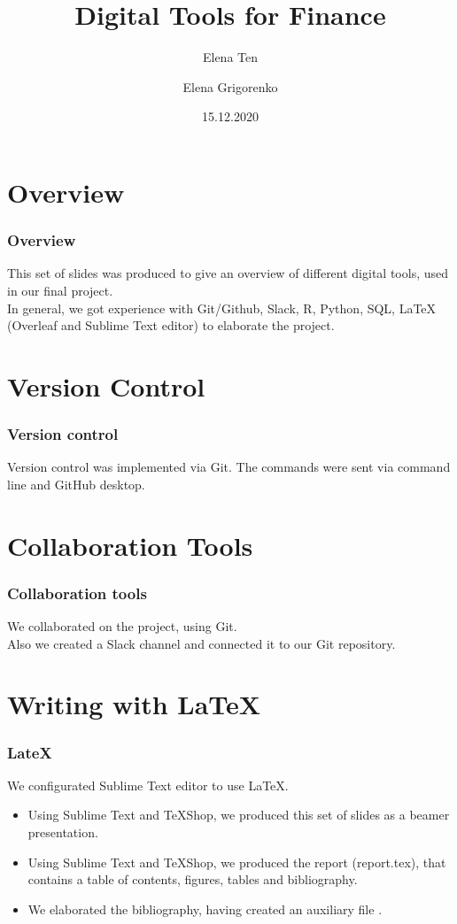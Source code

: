 \documentclass {beamer}
\title{Digital Tools for Finance}
\author [Ten, Grigorenko] {Elena Ten \and Elena Grigorenko}
\institute [UZH] {University of Zurich}
\date {15.12.2020}
\begin{document}
\frame{\titlepage}

\section{Overview}
\begin{frame}
\frametitle{Overview}
This set of slides was produced to give an overview of different digital tools, used in our final project.\\
In general, we got experience with Git/Github, Slack, R, Python, SQL, LaTeX (Overleaf and Sublime Text editor) to elaborate the project. 

\end{frame}



\section{Version Control}
\begin{frame}
\frametitle{Version control}
Version control was implemented via Git. The commands were sent via command line and GitHub desktop.

\end{frame}


\section{Collaboration Tools}
\begin{frame}
\frametitle{Collaboration tools}
We collaborated on the project, using Git.\\
Also we created a Slack channel and connected it to our Git repository.

\end{frame}


\section{Writing with LaTeX}
\begin{frame}
\frametitle{LateX}
We configurated Sublime Text editor to use LaTeX.\\
\begin{itemize}
\item Using Sublime Text and TeXShop, we produced this set of slides as a beamer presentation.
\item Using Sublime Text and TeXShop, we produced the report (report.tex), that contains a table of contents, figures, tables and bibliography.
\item We elaborated the bibliography, having created an auxiliary file .
\end{itemize}

\end{frame}
\end{document}
